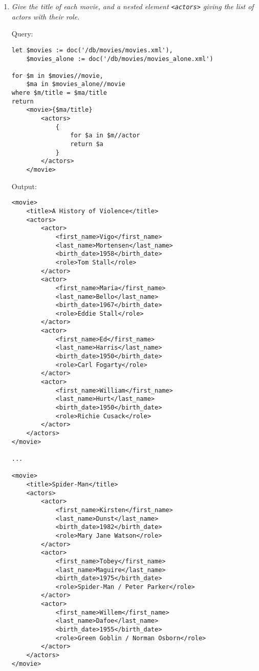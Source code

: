 \documentclass[a4paper, notitlepage]{article}
\begin{document}
\begin{enumerate}
\begin{lstlisting}
for $m in $movies//movie,
    $ma in $movies_alone//movie
where $m/title = $ma/title    
return
    <movie>{$ma/title/text()} ({$m/director/last_name/text()}, {$m/director/first_name/text()})</movie>
\end{lstlisting}

Output:

\begin{lstlisting}
<movie>A History of Violence (Cronenberg, David)</movie>
<movie>Heat (Mann, Michael)</movie>
<movie>Unforgiven (Eastwood, Clint)</movie>
<movie>Match Point (Allen, Woody)</movie>
<movie>Lost in Translation (Coppola, Sofia)</movie>
<movie>Marie Antoinette (Coppola, Sofia)</movie>
<movie>Spider-Man (Raimi, Sam)</movie>
\end{lstlisting}

\item \emph{Give the title of each movie, and a nested element \lstinline{<actors>} giving the list of actors with their role.}

Query:

\begin{lstlisting}
let $movies := doc('/db/movies/movies.xml'),
    $movies_alone := doc('/db/movies/movies_alone.xml')

for $m in $movies//movie,
    $ma in $movies_alone//movie
where $m/title = $ma/title    
return
    <movie>{$ma/title}
        <actors>
            {
                for $a in $m//actor
                return $a
            }
        </actors>
    </movie>
\end{lstlisting}

Output:

\begin{lstlisting}
<movie>
	<title>A History of Violence</title>
	<actors>
		<actor>
			<first_name>Vigo</first_name>
			<last_name>Mortensen</last_name>
			<birth_date>1958</birth_date>
			<role>Tom Stall</role>
		</actor>
		<actor>
			<first_name>Maria</first_name>
			<last_name>Bello</last_name>
			<birth_date>1967</birth_date>
			<role>Eddie Stall</role>
		</actor>
		<actor>
			<first_name>Ed</first_name>
			<last_name>Harris</last_name>
			<birth_date>1950</birth_date>
			<role>Carl Fogarty</role>
		</actor>
		<actor>
			<first_name>William</first_name>
			<last_name>Hurt</last_name>
			<birth_date>1950</birth_date>
			<role>Richie Cusack</role>
		</actor>
	</actors>
</movie>

...

<movie>
	<title>Spider-Man</title>
	<actors>
		<actor>
			<first_name>Kirsten</first_name>
			<last_name>Dunst</last_name>
			<birth_date>1982</birth_date>
			<role>Mary Jane Watson</role>
		</actor>
		<actor>
			<first_name>Tobey</first_name>
			<last_name>Maguire</last_name>
			<birth_date>1975</birth_date>
			<role>Spider-Man / Peter Parker</role>
		</actor>
		<actor>
			<first_name>Willem</first_name>
			<last_name>Dafoe</last_name>
			<birth_date>1955</birth_date>
			<role>Green Goblin / Norman Osborn</role>
		</actor>
	</actors>
</movie>
\end{lstlisting}


\end{enumerate}
\end{document}
